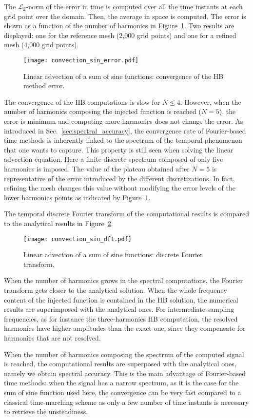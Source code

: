 The $\mathcal{L}_2$-norm of the error 
in time is computed over all the time instants
at each grid point over the domain.
Then, the average in space is computed.
The error is shown as a function of the number of harmonics
in Figure~\ref{fig:conv_sum_sine}. Two results are displayed:
one for the reference mesh (2,000 grid points) and one for
a refined mesh (4,000 grid points).
\begin{figure}[htp]
  \centering
  \texttt{[image: convection\_sin\_error.pdf]}
  \caption{Linear advection of a sum of sine functions: convergence of the HB method error.}
  \label{fig:conv_sum_sine}
\end{figure}
The convergence of the HB computations is slow  for
$N \leq 4$. However, when the number of harmonics composing
the injected function is reached ($N=5$), the error is minimum and computing
more harmonics does not change the error. As introduced in 
Sec.~\ref{sec:spectral_accuracy},
the convergence rate 
of Fourier-based time methods is inherently linked to the spectrum of the
temporal phenomenon that one wants to capture. This property is still
seen when solving the linear advection equation.
Here a finite discrete spectrum composed of only five harmonics
is imposed.
The value of the plateau obtained 
after $N=5$ is representative of the error introduced by the different
discretizations. In fact, refining the mesh changes this value
without modifying the error levels of the lower harmonics points
as indicated by Figure~\ref{fig:conv_sum_sine}.

The temporal discrete Fourier transform
of the computational results is compared to the
analytical results in Figure~\ref{fig:dft_sin}.
\begin{figure}[htp]
  \centering
  \texttt{[image: convection\_sin\_dft.pdf]}
  \caption{Linear advection of a sum of sine functions: 
  discrete Fourier transform.}
  \label{fig:dft_sin}
\end{figure}
When the number of harmonics grows in the spectral computations,
the Fourier transform gets closer to the analytical solution.
When the whole frequency content of the injected 
function is contained in the HB solution, 
the numerical results are superimposed with the analytical ones.
For intermediate sampling frequencies, as for 
instance the three-harmonics HB computation, 
the resolved harmonics have higher amplitudes 
than the exact one, since they compensate for harmonics that are not resolved.

When the number of harmonics composing the spectrum of the
computed signal is reached, the computational results are superposed
with the analytical ones, namely we obtain spectral accuracy.
This is the main advantage of Fourier-based time methods: when the
signal has a narrow spectrum, as it is the case for the sum
of sine function used here, the
convergence can be very fast compared to a classical time-marching scheme
as only a few number of time instants is necessary to retrieve the
unsteadiness.



